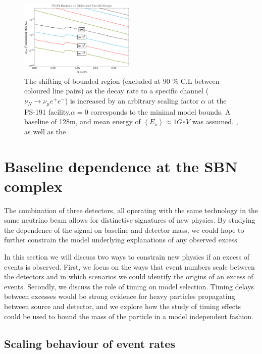 \documentclass[11pt, a4paper]{article}
\begin{document}
 
\begin{figure}[t]
%
\centering
%
\includegraphics[width=0.49\textwidth]{figures/ps191_enhanced.pdf} 
%
\caption{\label{fig:ps191_enhance}The shifting of bounded region (excluded at
90 \% C.L  between coloured line pairs) as the decay rate to a specific channel
($\nu_N \rightarrow \nu_\mu e^+e^-$) is increased by an arbitrary scaling
factor $\alpha$ at the PS-191 facility,$\alpha = 0$ corresponds to the minimal
model bounds. A baseline of 128m, and mean energy of $\left< E_\nu \right>
\approx 1 GeV$ was assumed.  , as well as the }
%
\end{figure}

\section{\label{sec:baselineinterplay}Baseline dependence at the SBN complex}

The combination of three detectors, all operating with the same technology in
the same neutrino beam allows for distinctive signatures of new physics. By
studying the dependence of the signal on baseline and detector mass, we could
hope to further constrain the model underlying explanations of any observed
excess.  

In this section we will discuss two ways to constrain new physics if an excess
of events is observed. First, we focus on the ways that event numbers scale
between the detectors and in which scenarios we could identify the origins of
an excess of events. Secondly, we discuss the role of timing on model selection.
Timing delays between excesses would be strong evidence for heavy particles 
propagating between source and detector, and we explore how the study of timing
effects could be used to bound the mass of the particle in a model independent 
fashion.

\subsection{Scaling behaviour of event rates}
\end{document}
